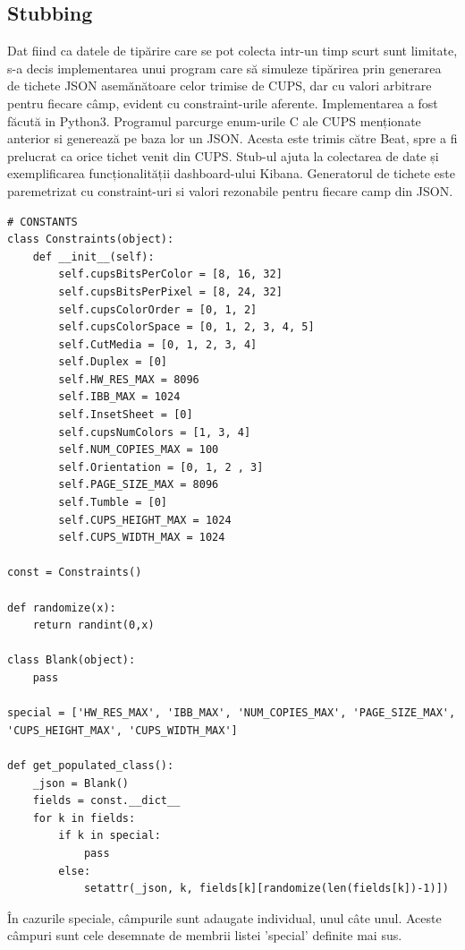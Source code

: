 \documentclass[12pt]{report}
\begin{document}
	\subsection{Stubbing}
	Dat fiind ca datele de tipărire care se pot colecta intr-un timp scurt sunt limitate, s-a decis implementarea unui program care să simuleze tipărirea prin generarea de tichete JSON asemănătoare celor trimise de CUPS, dar cu valori arbitrare pentru fiecare câmp, evident cu constraint-urile aferente. Implementarea a fost făcută in Python3. Programul parcurge enum-urile C ale CUPS menționate anterior si generează pe baza lor un JSON. Acesta este trimis către Beat, spre a fi prelucrat ca orice tichet venit din CUPS. Stub-ul ajuta la colectarea de date și exemplificarea funcționalității dashboard-ului Kibana. Generatorul de tichete este paremetrizat cu constraint-uri si valori rezonabile pentru fiecare camp din JSON.  
\begin{lstlisting}[caption={cazul general dupa care se populeaza tichetul - Pyton},captionpos=b]
# CONSTANTS
class Constraints(object):
    def __init__(self):
        self.cupsBitsPerColor = [8, 16, 32]
        self.cupsBitsPerPixel = [8, 24, 32]
        self.cupsColorOrder = [0, 1, 2]
        self.cupsColorSpace = [0, 1, 2, 3, 4, 5]
        self.CutMedia = [0, 1, 2, 3, 4]
        self.Duplex = [0]
        self.HW_RES_MAX = 8096
        self.IBB_MAX = 1024
        self.InsetSheet = [0]
        self.cupsNumColors = [1, 3, 4]
        self.NUM_COPIES_MAX = 100
        self.Orientation = [0, 1, 2 , 3]
        self.PAGE_SIZE_MAX = 8096
        self.Tumble = [0]
        self.CUPS_HEIGHT_MAX = 1024
        self.CUPS_WIDTH_MAX = 1024

const = Constraints()

def randomize(x):
    return randint(0,x)

class Blank(object):
    pass

special = ['HW_RES_MAX', 'IBB_MAX', 'NUM_COPIES_MAX', 'PAGE_SIZE_MAX', 'CUPS_HEIGHT_MAX', 'CUPS_WIDTH_MAX']

def get_populated_class():
    _json = Blank()
    fields = const.__dict__
    for k in fields:
        if k in special:
            pass
        else:
            setattr(_json, k, fields[k][randomize(len(fields[k])-1)])
\end{lstlisting}
În cazurile speciale, câmpurile sunt adaugate individual, unul câte unul. Aceste câmpuri sunt cele desemnate de membrii listei 'special' definite mai sus.
\end{document}
